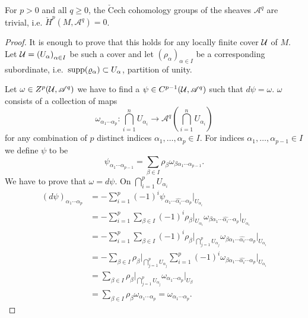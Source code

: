 \documentclass[11pt]{preprint}
\def\cA{\mathscr{A}}
\def\Cech{\check{H}}
\numberwithin{equation}{section}
\begin{document}
\begin{lemma}
    For $p > 0$ and all $q\geqslant 0$, the $\check{\mathrm{C}}$ech cohomology groups of the sheaves $\cA^q$ are trivial, i.e. $\Cech^p(M,\cA^q) = 0$. 
\end{lemma}
\begin{proof}
  It is enough to prove that this holds for any locally finite cover ${\mathcal U}$ of $M$. Let $\CU = \left( U_\alpha\right)_{\alpha \in I}$ be such a cover and let $\left(\rho_\alpha\right)_{\alpha \in I}$ be a corresponding subordinate, i.e.\ $\operatorname*{supp}(\varrho_\alpha) \subset U_\alpha$, partition of unity.

  Let $\omega \in Z^p(\CU, \cA^q)$ we have to find a $\psi \in C^{p-1}(\CU, \cA^q)$ such that $d \psi = \omega$. %
  $\omega$ consists of a collection of maps 
  \[
      \omega_{\alpha_1 \cdots \alpha_p} : \bigcap_{i = 1}^n U_{\alpha_i} \longrightarrow \cA^q \left( \bigcap_{i = 1}^n U_{\alpha_i} \right)
  \]
  for any combination of $p$ distinct indices $\alpha_1, \dots, \alpha_p \in I$. For indices $\alpha_1, \dots, \alpha_{p-1} \in I$ we define $\psi$ to be
  \[
    \psi_{\alpha_1 \cdots \alpha_{p-1}} = \sum_{\beta \in I} \rho_\beta \omega_{\beta\alpha_1 \cdots \alpha_{p-1}}.
  \]
  We have to prove that $\omega = d \psi$. On $\bigcap_{i = 1}^p U_{\alpha_i}$
  \begin{align*}
    \left(d \psi\right)_{\alpha_1 \cdots \alpha_{p}} &= - \sum_{i = 1}^p (-1)^i \psi_{\alpha_1 \cdots \widehat{\alpha_i} \cdots \alpha_p} \big|_{U_{\alpha_i}}  \\
    & = - \sum_{i = 1}^p \sum_{\beta \in I} (-1)^i \rho_\beta \big|_{U_{\alpha_i}} \omega_{\beta\alpha_1 \cdots \widehat{\alpha_i} \cdots \alpha_p} \big|_{U_{\alpha_i}}  \\
    & = - \sum_{i = 1}^p \sum_{\beta \in I} (-1)^i \rho_\beta \big|_{\bigcap_{j = 1}^p U_{\alpha_j}} \omega_{\beta\alpha_1 \cdots \widehat{\alpha_i} \cdots \alpha_p} \big|_{U_{\alpha_i}}  \\
    & = - \sum_{\beta \in I} \rho_\beta \big|_{\bigcap_{j = 1}^p U_{\alpha_j}}  \sum_{i = 1}^p (-1)^i \omega_{\beta\alpha_1 \cdots \widehat{\alpha_i} \cdots \alpha_p} \big|_{U_{\alpha_i}} \\
    & = \sum_{\beta \in I} \rho_\beta \big|_{\bigcap_{j = 1}^p U_{\alpha_j}}   \omega_{\alpha_1  \cdots \alpha_p} \big|_{U_{\beta}} \\
    & = \sum_{\beta \in I} \rho_\beta  \omega_{\alpha_1  \cdots \alpha_p} =\omega_{\alpha_1  \cdots \alpha_p} .

\end{align*}
\end{proof}
\end{document}
